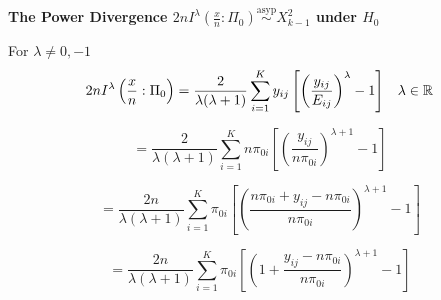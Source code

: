\documentclass{article}\usepackage[]{graphicx}\usepackage[]{color}
\numberwithin{equation}{subsection} %
\newenvironment{proof}[1][Proof]{\begin{trivlist}
\item[\hskip \labelsep {\bfseries #1}]}{\end{trivlist}}
\begin{document}
\textbf{The Power Divergence  $2nI^{\lambda}\left(\frac{x}{n}:\Pi_{0} \right) \stackrel{\text{asyp}}{\sim} X^{2}_{k-1}$ under $H_{0}$}
\begin{proof}
For $\lambda \neq 0,-1$\\

\begin{equation*}
2nI^{\lambda}\left(\frac{x}{n}:\Pi_{0} \right)=\frac{2}{\lambda(\lambda+1)}\sum\limits_{i=1}^{K}y_{ij}\left[\left(\frac{y_{ij}}{E_{ij}}\right)^{\lambda}-1\right]\hspace{3mm}\lambda \in \mathbb{R}
\end{equation*}






\begin{equation*}
=\frac{2}{\lambda(\lambda+1)}\sum\limits_{i=1}^{K}n\pi_{0i}\left[\left(\frac{y_{ij}}{n\pi_{0i}}\right)^{\lambda+1}-1\right]
\end{equation*}

\begin{equation*}
=\frac{2n}{\lambda(\lambda+1)}\sum\limits_{i=1}^{K}\pi_{0i}\left[\left(\frac{n\pi_{0i}+y_{ij}-n\pi_{0i}}{n\pi_{0i}}\right)^{\lambda+1}-1\right]
\end{equation*}

\begin{equation*}
=\frac{2n}{\lambda(\lambda+1)}\sum\limits_{i=1}^{K}\pi_{0i}\left[\left(1+\frac{y_{ij}-n\pi_{0i}}{n\pi_{0i}}\right)^{\lambda+1}-1\right]
\end{equation*}










\end{proof}
\end{document}
